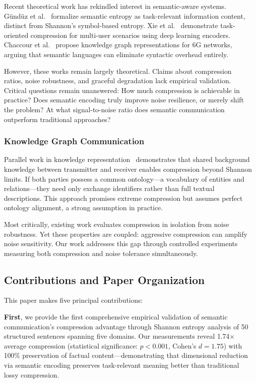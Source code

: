 \documentclass[conference]{IEEEtran}
\begin{document}
Recent theoretical work has rekindled interest in semantic-aware systems. 
Gündüz et al.~\cite{Gunduz2022} formalize semantic entropy as task-relevant 
information content, distinct from Shannon's symbol-based entropy. Xie 
et al.~\cite{Xie2021} demonstrate task-oriented compression for multi-user 
scenarios using deep learning encoders. Chaccour et al.~\cite{Chaccour2024} 
propose knowledge graph representations for 6G networks, arguing that 
semantic languages can eliminate syntactic overhead entirely.

However, these works remain largely theoretical. Claims about compression 
ratios, noise robustness, and graceful degradation lack empirical validation. 
Critical questions remain unanswered: How much compression is achievable 
in practice? Does semantic encoding truly improve noise resilience, or 
merely shift the problem? At what signal-to-noise ratio does semantic 
communication outperform traditional approaches?

\subsubsection{Knowledge Graph Communication}

Parallel work in knowledge representation~\cite{Strinati2021,Qin2021} 
demonstrates that shared background knowledge between transmitter and 
receiver enables compression beyond Shannon limits. If both parties 
possess a common ontology—a vocabulary of entities and relations—they 
need only exchange identifiers rather than full textual descriptions. 
This approach promises extreme compression but assumes perfect ontology 
alignment, a strong assumption in practice.

Most critically, existing work evaluates compression in isolation from 
noise robustness. Yet these properties are coupled: aggressive compression 
can amplify noise sensitivity. Our work addresses this gap through 
controlled experiments measuring both compression and noise tolerance 
simultaneously.

\subsection{Contributions and Paper Organization}

This paper makes five principal contributions:

\textbf{First}, we provide the first comprehensive empirical validation 
of semantic communication's compression advantage through Shannon entropy 
analysis of 50 structured sentences spanning five domains. Our measurements 
reveal 1.74× average compression (statistical significance: $p < 0.001$, 
Cohen's $d = 1.75$) with 100\% preservation of factual content—demonstrating 
that dimensional reduction via semantic encoding preserves task-relevant 
meaning better than traditional lossy compression.
\end{document}
